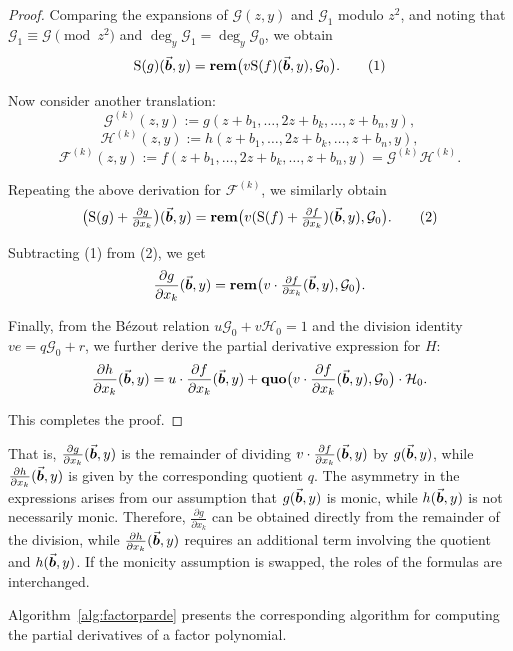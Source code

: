 \documentclass{article}
\numberwithin{equation}{section}
\begin{document}
\begin{proof}
Comparing the expansions of \(\mathcal{G}(z,y)\) and \(\mathcal{G}_1\) modulo \(z^2\), and noting that \(\mathcal{G}_1 \equiv \mathcal{G} \pmod{z^2}\) and \(\deg_y \mathcal{G}_1 = \deg_y \mathcal{G}_0\), we obtain
\[
{\rm S}(g)(\vec{\boldsymbol{b}},y) = \mathbf{rem}\bigl(v {\rm S}(f)(\vec{\boldsymbol{b}},y), \mathcal{G}_0\bigr). \tag{1}
\]

Now consider another translation:
\[
\mathcal{G}^{(k)}(z, y) := g(z+b_1, \dots, 2z+b_k, \dots, z+b_n, y),
\]
\[
\mathcal{H}^{(k)}(z, y) := h(z+b_1, \dots, 2z+b_k, \dots, z+b_n, y),
\]
\[
\mathcal{F}^{(k)}(z, y) := f(z+b_1, \dots, 2z+b_k, \dots, z+b_n, y) = \mathcal{G}^{(k)} \mathcal{H}^{(k)}.
\]

Repeating the above derivation for \(\mathcal{F}^{(k)}\), we similarly obtain
\[
\bigl({\rm S}(g) + \tfrac{\partial g}{\partial x_k}\bigr)(\vec{\boldsymbol{b}},y) = \mathbf{rem}\bigl(v ({\rm S}(f) + \tfrac{\partial f}{\partial x_k})(\vec{\boldsymbol{b}},y), \mathcal{G}_0\bigr). \tag{2}
\]

Subtracting (1) from (2), we get
\[
\frac{\partial g}{\partial x_k}(\vec{\boldsymbol{b}},y) = \mathbf{rem}\bigl(v \cdot \tfrac{\partial f}{\partial x_k}(\vec{\boldsymbol{b}},y), \mathcal{G}_0\bigr).
\]

Finally, from the B\'ezout relation \(u \mathcal{G}_0 + v \mathcal{H}_0 = 1\) and the division identity \(v e = q \mathcal{G}_0 + r\), we further derive the partial derivative expression for \(H\):
\[
\frac{\partial h}{\partial x_k}(\vec{\boldsymbol{b}},y) = u \cdot \frac{\partial f}{\partial x_k}(\vec{\boldsymbol{b}},y) + \mathbf{quo}\bigl(v \cdot \frac{\partial f}{\partial x_k}(\vec{\boldsymbol{b}},y), \mathcal{G}_0\bigr) \cdot \mathcal{H}_0.
\]

This completes the proof.
\end{proof}

\begin{remark}
That is, \(\frac{\partial g}{\partial x_k}(\vec{\boldsymbol{b}}, y)\) is the remainder of dividing \(v \cdot \frac{\partial f}{\partial x_k}(\vec{\boldsymbol{b}}, y)\) by \(g(\vec{\boldsymbol{b}}, y)\), while \(\frac{\partial h}{\partial x_k}(\vec{\boldsymbol{b}}, y)\) is given by the corresponding quotient \(q\). The asymmetry in the expressions arises from our assumption that \(g(\vec{\boldsymbol{b}},y)\) is monic, while \(h(\vec{\boldsymbol{b}},y)\) is not necessarily monic. Therefore, \(\frac{\partial g}{\partial x_k}\) can be obtained directly from the remainder of the division, while \(\frac{\partial h}{\partial x_k}(\vec{\boldsymbol{b}}, y)\) requires an additional term involving the quotient and \(h(\vec{\boldsymbol{b}},y)\). If the monicity assumption is swapped, the roles of the formulas are interchanged.
\end{remark}

Algorithm~\ref{alg:factorparde} presents the corresponding algorithm for computing the partial derivatives of a factor polynomial.
\end{document}

